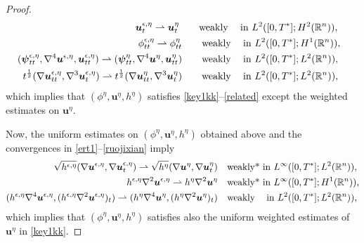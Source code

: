 \documentclass[11pt,reqno]{amsart}
\numberwithin{rk}{section}
\numberwithin{prop}{section}
\numberwithin{mydef}{section}
\numberwithin{lem}{section}
\numberwithin{equation}{section}
\numberwithin{thm}{section}
\begin{document}
\begin{proof}
\begin{align}
\begin{aligned}
\boldsymbol{u}^{\epsilon,\eta}_{t} \rightharpoonup  \boldsymbol{u}^{\eta}_{t}\qquad &\text{weakly \hspace{2mm}  in } L^2([0,T^*];H^2(\mathbb{R}^n)), 
\end{aligned}\\
\begin{aligned}
\phi^{\epsilon,\eta}_{tt} \rightharpoonup    \phi^{\eta}_{tt} \qquad &\text{weakly \hspace{2mm}  in } L^2([0,T^*];H^1(\mathbb{R}^n)),\\
(\boldsymbol{\psi}^{\epsilon,\eta}_{tt},\nabla^4 \boldsymbol{u}^{\epsilon,\eta},
\boldsymbol{u}^{\epsilon,\eta}_{tt}) \rightharpoonup  (\boldsymbol{\psi}^{\eta}_{tt},\nabla^4 \boldsymbol{u}^{\eta} ,\boldsymbol{u}^{\eta}_{tt})\qquad &\text{weakly \hspace{2mm}  in } L^2([0,T^*];L^2(\mathbb{R}^n)),\\
t^{\frac{1}{2}}(\nabla \boldsymbol{u}^{\epsilon,\eta}_{tt},\nabla^3\boldsymbol{u}^{\epsilon,\eta}_t) \rightharpoonup  t^{\frac{1}{2}}(\nabla \boldsymbol{u}^{\eta}_{tt},\nabla^3\boldsymbol{u}^{\eta}_t) \qquad &\text{weakly \hspace{2mm}  in } L^2([0,T^*];L^2(\mathbb{R}^n)),\notag
\end{aligned}\hspace{2.5mm}
\end{align}
which implies that $(\phi^\eta,  \boldsymbol{u}^\eta, h^\eta) $  satisfies  \eqref{key1kk}--\eqref{related} except the weighted estimates on $\boldsymbol{u}^\eta$.

Now,  the uniform estimates on $(\phi^\eta,  \boldsymbol{u}^\eta,  h^\eta) $ obtained above  and  the    convergences in \eqref{ert1}--\eqref{ruojixian} imply
\begin{equation}\label{ruojixian2}
\begin{aligned}
\sqrt{h^{\epsilon,\eta}}( \nabla \boldsymbol{u}^{\epsilon,\eta}, \nabla \boldsymbol{u}^{\epsilon,\eta}_t) \rightharpoonup \sqrt{h^{\eta}} ( \nabla \boldsymbol{u}^{\eta},\nabla \boldsymbol{u}^{\eta}_t) \quad &\text{weakly* in } L^\infty([0,T^*];L^2(\mathbb{R}^n)),\\
h^{\epsilon,\eta}\nabla^2 \boldsymbol{u}^{\epsilon,\eta} \rightharpoonup  h^{\eta}\nabla^2 \boldsymbol{u}^{\eta} \quad &\text{weakly* in } L^\infty([0,T^*];H^1(\mathbb{R}^n)),\\
(h^{\epsilon,\eta}\nabla^4 \boldsymbol{u}^{\epsilon,\eta},
 (h^{\epsilon,\eta}\nabla^2 \boldsymbol{u}^{\epsilon,\eta})_t)
\rightharpoonup (h^{\eta}\nabla^4 \boldsymbol{u}^{\eta},
(h^{\eta}\nabla^2 \boldsymbol{u}^{\eta})_t) 
\quad &\text{weakly \hspace{2mm} in } L^2([0,T^*]; L^2(\mathbb{R}^n)),
\end{aligned}
\end{equation}
which implies that $(\phi^\eta,  \boldsymbol{u}^\eta,  h^\eta) $  satisfies also the uniform weighted  estimates of   $ \boldsymbol{u}^{\eta}$ in \eqref{key1kk}.



\end{proof}
\end{document}
